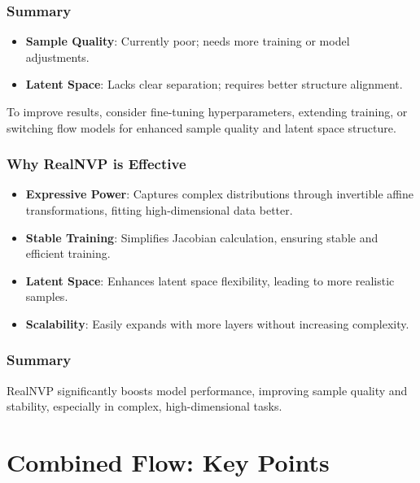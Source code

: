 \documentclass[11pt]{article}
\providecommand{\tightlist}{%
      \setlength{\itemsep}{0pt}\setlength{\parskip}{0pt}}
\begin{document}
\subsubsection{Summary}\label{summary}

\begin{itemize}
\tightlist
\item
  \textbf{Sample Quality}: Currently poor; needs more training or model
  adjustments.
\item
  \textbf{Latent Space}: Lacks clear separation; requires better
  structure alignment.
\end{itemize}

To improve results, consider fine-tuning hyperparameters, extending
training, or switching flow models for enhanced sample quality and
latent space structure.

    \subsubsection{Why RealNVP is Effective}\label{why-realnvp-is-effective}

\begin{itemize}
\tightlist
\item
  \textbf{Expressive Power}: Captures complex distributions through
  invertible affine transformations, fitting high-dimensional data
  better.
\item
  \textbf{Stable Training}: Simplifies Jacobian calculation, ensuring
  stable and efficient training.
\item
  \textbf{Latent Space}: Enhances latent space flexibility, leading to
  more realistic samples.
\item
  \textbf{Scalability}: Easily expands with more layers without
  increasing complexity.
\end{itemize}

\subsubsection{Summary}\label{summary}

RealNVP significantly boosts model performance, improving sample quality
and stability, especially in complex, high-dimensional tasks.

    \section{Combined Flow: Key Points}\label{combined-flow-key-points}
\end{document}
